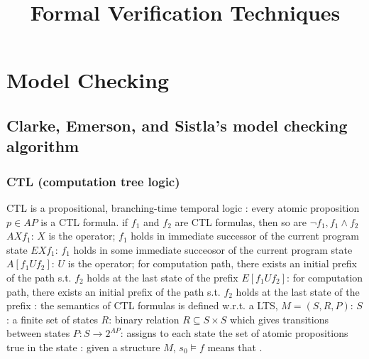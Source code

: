 \documentclass{note}
\begin{document}
\small

\title{Formal Verification Techniques}
\author{}
\maketitle

\tableofcontents


\section{Model Checking}
\subsection{Clarke, Emerson, and Sistla's model checking algorithm}
\subsubsection{CTL (computation tree logic)}
  \bit
  \w CTL is a propositional, branching-time temporal logic 
  \w {}:
   \ben
   \w [(a)] every atomic proposition $p \in AP$ is a CTL formula.
   \w [(b)] if $f_1$ and $f_2$ are CTL formulas, then so are
       \bit
       \w $\neg f_1, f_1 \wedge f_2$ 
       \w $AXf_1$: $X$ is the  operator; $f_1$ holds in 
       immediate successor of the current program state
       \w $EXf_1$: $f_1$ holds in some immediate succeosor of the current
       program state
       \w $A[f_1 U f_2]$: $U$ is the  operator; for 
       computation path, there exists an initial prefix of the path s.t. $f_2$
       holds at the last state of the prefix 
       \w $E[f_1 U f_2]$: for  computation path, there exists an initial
       prefix of the path s.t. $f_2$ holds at the last state of the prefix
       \eit
   \een
  \w {}: the semantics of CTL formulas is defined w.r.t. a LTS, $M = (S, R, P)$:
   \bit
   \w $S$: a finite set of states
   \w $R$: binary relation $R \subseteq S \times S$ which gives transitions
   between states
   \w $P: S \rightarrow 2^{AP}$: assigns to each state the set of atomic
   propositions true in the state
   \eit
  \w {}: given a structure $M$, $s_0 \models f$ means that . 
\end{document}
